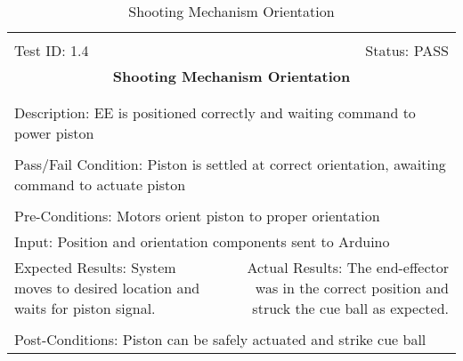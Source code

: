 \documentclass[titlepage]{article}
\begin{document}
\begin{center}
\begin{table}[h!]
\begin{tabular}{|l r|}\hline&\\[-2mm]
	Test ID: 1.4	&Status: PASS\\[-3mm]
	\multicolumn{2}{|c|}{\textbf{\large{Shooting Mechanism Orientation}}}\\&\\\hline&\\[-3mm]
	\multicolumn{2}{|p{\textwidth}|}{Description: EE is positioned correctly and waiting command to power piston}\\[1mm]\hline&\\[-3mm]
	\multicolumn{2}{|p{\textwidth}|}{Pass/Fail Condition: Piston is settled at correct orientation, awaiting command to actuate piston}\\[1mm]\hline&\\[-3mm]
	\multicolumn{2}{|p{\textwidth}|}{Pre-Conditions: Motors orient piston to proper orientation}\\[4mm]
	\multicolumn{2}{|p{\textwidth}|}{Input: Position and orientation components sent to Arduino}\\[2mm]\hline
	\multicolumn{1}{|p{0.49\textwidth}}{Expected Results: System moves to desired location and waits for piston signal.}	&\multicolumn{1}{|p{0.45\textwidth}|}{Actual Results: The end-effector was in the correct position and struck the cue ball as expected.}\\\hline&\\[-3mm]
	\multicolumn{2}{|p{\textwidth}|}{Post-Conditions: Piston can be safely actuated and strike cue ball}\\\hline
\end{tabular}
\caption{Shooting Mechanism Orientation}
\end{table}
\end{center}
\end{document}
